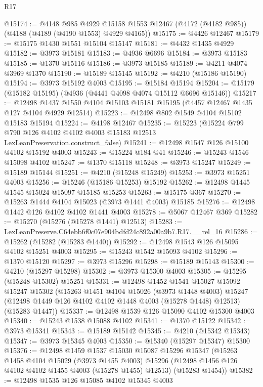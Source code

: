 \begin{lexlean}{R17}
\begin{coremodule}
@15174 := @4148
    @985
    @4929
    @15158
    @1553
    @12467
    (@4172 (@4182 @985))
    (@4188 (@4189 (@4190 @1553) @4929 @4165))
@15175 := @4426 @12467
@15179 := @15175 @1430 @1551 @15104 @15147
@15181 := @4432 @1435 @4929
@15182 := @3973 @15181
@15183 := @4936 @6696
@15184 := @3973 @15183
@15185 := @1370 @15116
@15186 := @3973 @15185
@15189 := @4211 @4074 @3969 @1370
@15190 := @15189 @15145
@15192 := @4210 (@15186 @15190)
@15194 := @3973 @15192 @4003
@15195 := @15184 @15194
@15204 := @15179 (@15182 @15195) (@4936 (@4441 @4098 @4074 @15112 @6696 @15146))
@15217 := @12498 @1437 @1550 @4104 @15103 @15181 @15195 (@4457 @12467 @1435 @127 @4104 @4929 @12514)
@15223 := @12498 @802 @1549 @4104 @15102 @15183 @15194
@15224 := @4198 @12467
@15235 := @15223
    (@15224 @799 @790 @126 @4102 @4102 @4003 @15183 @12513 LexLeanPreservation.construct_false)
@15241 := @12498 @1547 @126 @15100 @4102 @15192 @4003
@15243 := @15224 @184 @41
@15246 := @15243 @1546 @15098 @4102
@15247 := @1370 @15118
@15248 := @3973 @15247
@15249 := @15189 @15144
@15251 := @4210 (@15248 @15249)
@15253 := @3973 @15251 @4003
@15256 := @15246 (@15186 @15253) @15192
@15262 := @12498 @1445 @1545 @15024 @15097 @15185 @15253
@15263 := @15175 @367
@15270 := @15263 @1444 @4104 @15023 (@3973 @1441 @4003) @15185
@15276 := @12498 @1442 @126 @4102 @4102 @1441 @4003
@15278 := @5067 @12467 @369
@15282 := @15270 (@15276 (@15278 @1441) @12513)
@15283 := LexLeanPreserve.C64ebb6f0c07e904bdfd24c892a00a9b7.R17.__rel_16
@15286 := @15262 (@15282 (@15283 @1440))
@15292 := @12498 @1543 @126 @15095 @4102 @15251 @4003
@15295 := @15243 @1542 @15093 @4102
@15296 := @1370 @15120
@15297 := @3973 @15296
@15298 := @15189 @15143
@15300 := @4210 (@15297 @15298)
@15302 := @3973 @15300 @4003
@15305 := @15295 (@15248 @15302) @15251
@15331 := @12498
    @1452
    @1541
    @15027
    @15092
    @15247
    @15302
    (@15263
      @1451
      @4104
      @15026
      (@3973 @1448 @4003)
      @15247
      (@12498 @1449 @126 @4102 @4102 @1448 @4003 (@15278 @1448) @12513)
      (@15283 @1447))
@15337 := @12498 @1539 @126 @15090 @4102 @15300 @4003
@15340 := @15243 @1538 @15088 @4102
@15341 := @1370 @15122
@15342 := @3973 @15341
@15343 := @15189 @15142
@15345 := @4210 (@15342 @15343)
@15347 := @3973 @15345 @4003
@15350 := @15340 (@15297 @15347) @15300
@15376 := @12498
    @1459
    @1537
    @15030
    @15087
    @15296
    @15347
    (@15263
      @1458
      @4104
      @15029
      (@3973 @1455 @4003)
      @15296
      (@12498 @1456 @126 @4102 @4102 @1455 @4003 (@15278 @1455) @12513)
      (@15283 @1454))
@15382 := @12498 @1535 @126 @15085 @4102 @15345 @4003

\end{coremodule}
\end{lexlean}
